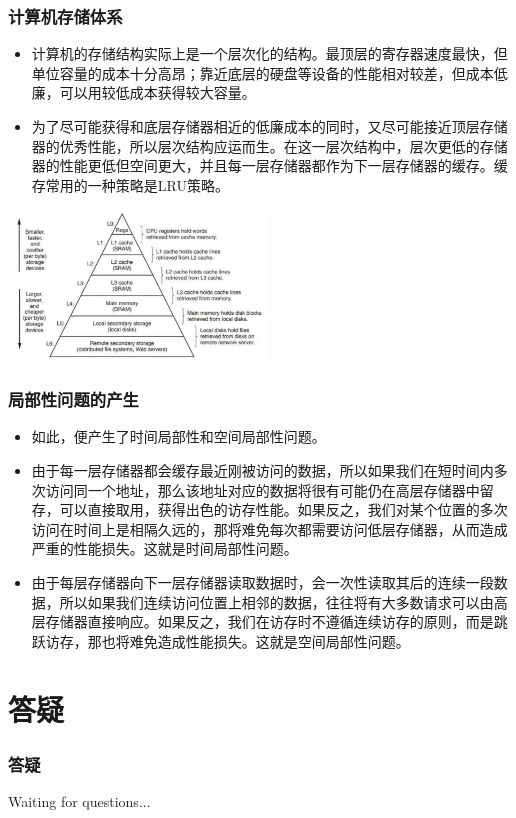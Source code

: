 \documentclass{beamer}
\begin{document}
\begin{frame}
\frametitle{计算机存储体系}
\begin{itemize}
    \item 计算机的存储结构实际上是一个层次化的结构。最顶层的寄存器速度最快，但单位容量的成本十分高昂；靠近底层的硬盘等设备的性能相对较差，但成本低廉，可以用较低成本获得较大容量。
    \item 为了尽可能获得和底层存储器相近的低廉成本的同时，又尽可能接近顶层存储器的优秀性能，所以层次结构应运而生。在这一层次结构中，层次更低的存储器的性能更低但空间更大，并且每一层存储器都作为下一层存储器的缓存。缓存常用的一种策略是LRU策略。
\end{itemize}
\centering\includegraphics[height=4cm]{memory.png}
\end{frame}

\begin{frame}
\frametitle{局部性问题的产生}
\begin{itemize}
    \item<1-> 如此，便产生了时间局部性和空间局部性问题。
    \item<2-> 由于每一层存储器都会缓存最近刚被访问的数据，所以如果我们在短时间内多次访问同一个地址，那么该地址对应的数据将很有可能仍在高层存储器中留存，可以直接取用，获得出色的访存性能。如果反之，我们对某个位置的多次访问在时间上是相隔久远的，那将难免每次都需要访问低层存储器，从而造成严重的性能损失。这就是时间局部性问题。
    \item<3-> 由于每层存储器向下一层存储器读取数据时，会一次性读取其后的连续一段数据，所以如果我们连续访问位置上相邻的数据，往往将有大多数请求可以由高层存储器直接响应。如果反之，我们在访存时不遵循连续访存的原则，而是跳跃访存，那也将难免造成性能损失。这就是空间局部性问题。
\end{itemize}
\end{frame}

\section{答疑}

\begin{frame}
\frametitle{答疑}
Waiting for questions...
\end{frame}
\end{document}
